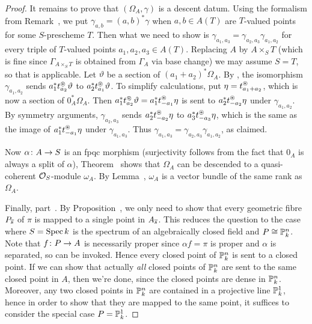 \documentclass[a4paper,parskip=half,numbers=enddot, DIV=12]{scrreprt}
\begin{document}
\begin{proof}
	It remains to prove that $(\Omega_A,\gamma)$ is a descent datum. Using the formalism from Remark~, we put $\gamma_{a,b}=(a,b)^*\gamma$ when $a,b\in A(T)$ are $T$-valued points for some $S$-prescheme $T$. Then what we need to show is $\gamma_{a_1,a_3}=\gamma_{a_2,a_3}\gamma_{a_1,a_2}$ for every triple of $T$-valued points $a_1,a_2,a_3\in A(T)$. Replacing $A$ by $A\times_ST$ (which is fine since $\Gamma_{A\times_ST}$ is obtained from $\Gamma_A$ via base change) we may assume $S=T$, so that  is applicable. Let $\vartheta$ be a section of $(a_1+a_2)^*\Omega_A$. By , the isomorphism $\gamma_{a_1,a_2}$ sends $a_1^*t_{a_2}^\oast\vartheta$ to $a_2^*t_{a_1}^\oast\vartheta$. To simplify calculations, put $\eta=t_{a_1+a_2}^\oast$, which is now a section of $0_A^*\Omega_A$. Then $a_1^*t_{a_2}^\oast\vartheta=a_1^*t_{-a_1}^\oast\eta$ is sent to $a_2^*t_{-a_2}^\oast\eta$ under $\gamma_{a_1,a_2}$. By symmetry arguments, $\gamma_{a_2,a_3}$ sends $a_2^*t_{-a_2}^\oast\eta$ to $a_3^*t_{-a_3}^\oast\eta$, which is the same as the image of $a_1^*t_{-a_1}^\oast\eta$ under $\gamma_{a_1,a_3}$. Thus $\gamma_{a_1,a_3}=\gamma_{a_2,a_3}\gamma_{a_1,a_2}$, as claimed.
	
	Now $\alpha\colon A\morphism S$ is an fpqc morphism (surjectivity follows from the fact that $0_A$ is always a split of $\alpha$), Theorem~ shows that $\Omega_A$ can be descended to a quasi-coherent $\mathcal{O}_S$-module $\omega_A$. By Lemma~, $\omega_A$ is a vector bundle of the same rank as $\Omega_A$.
	
	Finally, part~. By Proposition~, we only need to show that every geometric fibre $P_{\overline{s}}$ of $\pi$ is mapped to a single point in $A_{\overline{s}}$. This reduces the question to the case where $S=\operatorname{Spec} k$ is the spectrum of an algebraically closed field and $P\cong\mathbb{P}_k^n$. Note that $f\colon P\morphism A$ is necessarily proper since $\alpha f=\pi$ is proper and $\alpha$ is separated, so \cite[Proposition~2.4.1]{alggeo2} can be invoked. Hence every closed point of $\mathbb{P}_k^n$ is sent to a closed point. If we can show that actually \emph{all} closed points of $\mathbb{P}_k^n$ are sent to the same closed point in $A$, then we're done, since the closed points are dense in $\mathbb{P}_k^n$. Moreover, any two closed points in $\mathbb{P}_k^n$ are contained in a projective line $\mathbb{P}_k^1$, hence in order to show that they are mapped to the same point, it suffices to consider the special case $P=\mathbb{P}_k^1$.
	

\end{proof}
\end{document}
